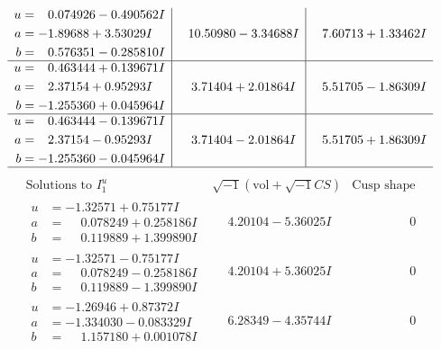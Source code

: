 \documentclass[1p]{elsarticle_modified}
\theoremstyle{definition}
\newcommand{\I}{\sqrt{-1}}
\begin{document}
$$\begin{array}{c|c|c}
\begin{aligned}
u &= \phantom{-}0.074926 - 0.490562 I \\
a &= -1.89688 + 3.53029 I \\
b &= \phantom{-}0.576351 - 0.285810 I\end{aligned}
 & \phantom{-}10.50980 - 3.34688 I & \phantom{-}7.60713 + 1.33462 I \\ \hline\begin{aligned}
u &= \phantom{-}0.463444 + 0.139671 I \\
a &= \phantom{-}2.37154 + 0.95293 I \\
b &= -1.255360 + 0.045964 I\end{aligned}
 & \phantom{-}3.71404 + 2.01864 I & \phantom{-}5.51705 - 1.86309 I \\ \hline\begin{aligned}
u &= \phantom{-}0.463444 - 0.139671 I \\
a &= \phantom{-}2.37154 - 0.95293 I \\
b &= -1.255360 - 0.045964 I\end{aligned}
 & \phantom{-}3.71404 - 2.01864 I & \phantom{-}5.51705 + 1.86309 I\\
 \hline 
 \end{array}$$\newpage$$\begin{array}{c|c|c}  
\text{Solutions to }I^u_{1}& \I (\text{vol} + \sqrt{-1}CS) & \text{Cusp shape}\\
 \hline 
\begin{aligned}
u &= -1.32571 + 0.75177 I \\
a &= \phantom{-}0.078249 + 0.258186 I \\
b &= \phantom{-}0.119889 + 1.399890 I\end{aligned}
 & \phantom{-}4.20104 - 5.36025 I & \phantom{-0.000000 } 0 \\ \hline\begin{aligned}
u &= -1.32571 - 0.75177 I \\
a &= \phantom{-}0.078249 - 0.258186 I \\
b &= \phantom{-}0.119889 - 1.399890 I\end{aligned}
 & \phantom{-}4.20104 + 5.36025 I & \phantom{-0.000000 } 0 \\ \hline\begin{aligned}
u &= -1.26946 + 0.87372 I \\
a &= -1.334030 - 0.083329 I \\
b &= \phantom{-}1.157180 + 0.001078 I\end{aligned}
 & \phantom{-}6.28349 - 4.35744 I & \phantom{-0.000000 } 0 \\ \hline\begin{aligned}

\end{aligned}
\end{array}$$
\end{document}
